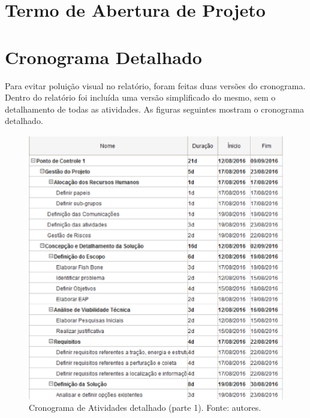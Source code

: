 \begin{apendicesenv}
\partapendices

\chapter{Termo de Abertura de Projeto}
\label{project_charter}

\chapter{Cronograma Detalhado}
\label{schedule_ap}

Para evitar poluição visual no relatório, foram feitas duas versões do cronograma.
Dentro do relatório foi incluída uma versão simplificado do mesmo, sem o detalhamento de todas as atividades.
As figuras seguintes mostram o cronograma detalhado.

\begin{figure}[!htbp]
  \centering
  \includegraphics[width=\textwidth]{figuras/cronograma_det_1.eps}
  \caption{Cronograma de Atividades detalhado (parte 1). Fonte: autores.}
  \label{fig:cron_d1}
\end{figure}

\vfill
\pagebreak


\end{apendicesenv}
